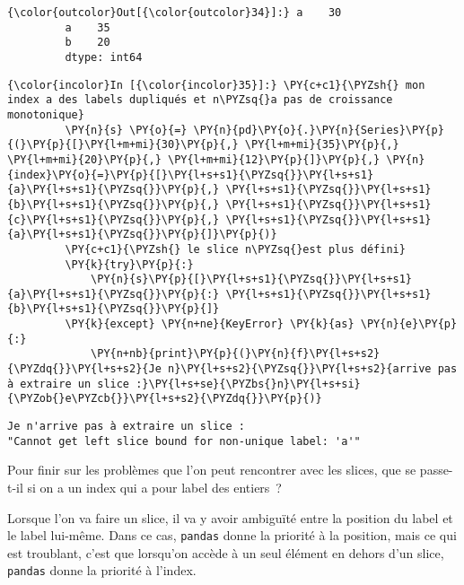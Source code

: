 \begin{Verbatim}[commandchars=\\\{\}]
{\color{outcolor}Out[{\color{outcolor}34}]:} a    30
         a    35
         b    20
         dtype: int64
\end{Verbatim}
            
    \begin{Verbatim}[commandchars=\\\{\}]
{\color{incolor}In [{\color{incolor}35}]:} \PY{c+c1}{\PYZsh{} mon index a des labels dupliqués et n\PYZsq{}a pas de croissance monotonique}
         \PY{n}{s} \PY{o}{=} \PY{n}{pd}\PY{o}{.}\PY{n}{Series}\PY{p}{(}\PY{p}{[}\PY{l+m+mi}{30}\PY{p}{,} \PY{l+m+mi}{35}\PY{p}{,} \PY{l+m+mi}{20}\PY{p}{,} \PY{l+m+mi}{12}\PY{p}{]}\PY{p}{,} \PY{n}{index}\PY{o}{=}\PY{p}{[}\PY{l+s+s1}{\PYZsq{}}\PY{l+s+s1}{a}\PY{l+s+s1}{\PYZsq{}}\PY{p}{,} \PY{l+s+s1}{\PYZsq{}}\PY{l+s+s1}{b}\PY{l+s+s1}{\PYZsq{}}\PY{p}{,} \PY{l+s+s1}{\PYZsq{}}\PY{l+s+s1}{c}\PY{l+s+s1}{\PYZsq{}}\PY{p}{,} \PY{l+s+s1}{\PYZsq{}}\PY{l+s+s1}{a}\PY{l+s+s1}{\PYZsq{}}\PY{p}{]}\PY{p}{)}
         \PY{c+c1}{\PYZsh{} le slice n\PYZsq{}est plus défini}
         \PY{k}{try}\PY{p}{:}
             \PY{n}{s}\PY{p}{[}\PY{l+s+s1}{\PYZsq{}}\PY{l+s+s1}{a}\PY{l+s+s1}{\PYZsq{}}\PY{p}{:} \PY{l+s+s1}{\PYZsq{}}\PY{l+s+s1}{b}\PY{l+s+s1}{\PYZsq{}}\PY{p}{]}
         \PY{k}{except} \PY{n+ne}{KeyError} \PY{k}{as} \PY{n}{e}\PY{p}{:}
             \PY{n+nb}{print}\PY{p}{(}\PY{n}{f}\PY{l+s+s2}{\PYZdq{}}\PY{l+s+s2}{Je n}\PY{l+s+s2}{\PYZsq{}}\PY{l+s+s2}{arrive pas à extraire un slice :}\PY{l+s+se}{\PYZbs{}n}\PY{l+s+si}{\PYZob{}e\PYZcb{}}\PY{l+s+s2}{\PYZdq{}}\PY{p}{)}
\end{Verbatim}


    \begin{Verbatim}[commandchars=\\\{\}]
Je n'arrive pas à extraire un slice :
"Cannot get left slice bound for non-unique label: 'a'"

    \end{Verbatim}

    Pour finir sur les problèmes que l'on peut rencontrer avec les slices,
que se passe-t-il si on a un index qui a pour label des entiers~?

Lorsque l'on va faire un slice, il va y avoir ambiguïté entre la
position du label et le label lui-même. Dans ce cas, \texttt{pandas}
donne la priorité à la position, mais ce qui est troublant, c'est que
lorsqu'on accède à un seul élément en dehors d'un slice, \texttt{pandas}
donne la priorité à l'index.

